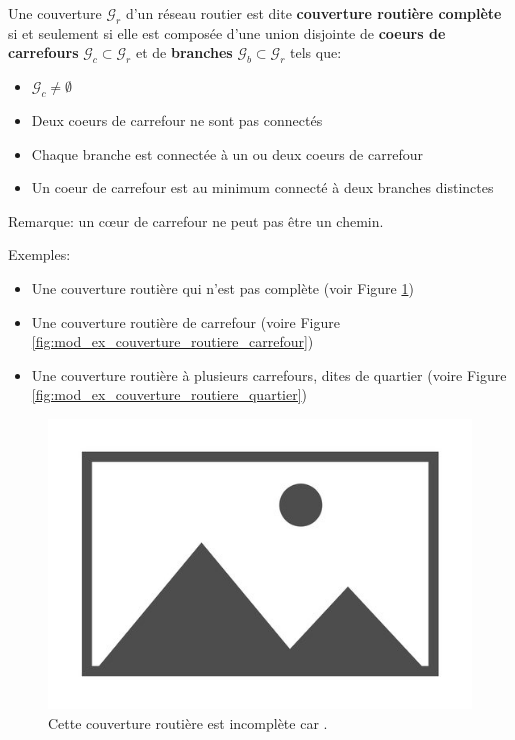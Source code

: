\begin{definition}
    Une couverture $\mathcal{G}_r$ d'un réseau routier est dite \textbf{couverture routière complète} si et seulement si elle est composée d'une union disjointe de \textbf{coeurs de carrefours} $\mathcal{G}_c \subset \mathcal{G}_r$ et de \textbf{branches} $\mathcal{G}_b \subset \mathcal{G}_r$ tels que:

    \begin{itemize}
        \item $\mathcal{G}_c \neq \emptyset$ 
        \item Deux coeurs de carrefour ne sont pas connectés
        \item Chaque branche est connectée à un ou deux coeurs de carrefour
        \item Un coeur de carrefour est au minimum connecté à deux branches distinctes
    \end{itemize}

    Remarque: un cœur de carrefour ne peut pas être un chemin.

    Exemples:
    \begin{itemize}
        \item Une couverture routière qui n'est pas complète (voir Figure \ref{fig:mod_ex_couverture_routiere_incomplete})
        \item Une couverture routière de carrefour (voire Figure \ref{fig:mod_ex_couverture_routiere_carrefour})
        \item Une couverture routière à plusieurs carrefours, dites de quartier (voire Figure \ref{fig:mod_ex_couverture_routiere_quartier})
    \end{itemize}
\end{definition}

\begin{figure}
    \centering
    \includegraphics{images/placeholder.jpg}
    \caption{Cette couverture routière est incomplète car \todo{}.}
    \label{fig:mod_ex_couverture_routiere_incomplete}
\end{figure}

